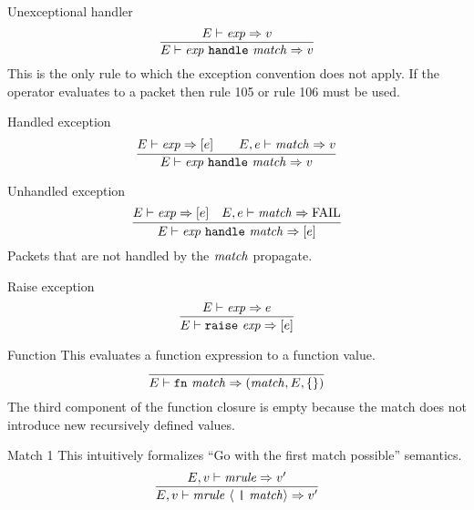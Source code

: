 \begin{inference-rule}{Unexceptional handler}
\begin{equation}\label{rule:dynamic-core:handlexp}
\vcenter{\infer{\E\ts\handlexp\ra\V}
  {\E\ts\exp\ra\V}}
\end{equation}
This is the only rule to which the exception convention does not apply.
If the operator evaluates to a packet then rule 105 or rule 106 must be
used.
\end{inference-rule}

\begin{inference-rule}{Handled exception}
\begin{equation}\label{rule:dynamic-core:handlexp2}
\vcenter{\infer{\E\ts\handlexp\ra\V}
  {\E\ts\exp\ra[\exval]\qquad\E,\exval\ts\match\ra\V}}
\end{equation}
\end{inference-rule}

\begin{inference-rule}{Unhandled exception}
\begin{equation}\label{rule:dynamic-core:handlexp3}
\vcenter{\infer{\E\ts\handlexp\ra[\exval]}
  {\E\ts\exp\ra[\exval]
    & \E,\exval\ts\match\ra\FAIL}}
\end{equation}
Packets that are not handled by the $\textit{match\/}$ propagate.
\end{inference-rule}

\begin{inference-rule}{Raise exception}
\begin{equation}\label{rule:dynamic-core:raisexp}
\vcenter{\infer{\E\ts\raisexp\ra[\exval]}
  {\E\ts\exp\ra\exval}}
\end{equation}
\end{inference-rule}

\begin{inference-rule}{Function}
This evaluates a function expression to a function value.
\begin{equation}\label{rule:dynamic-core:funexp}
\vcenter{\infer{\E\ts\fnexp\ra(\match,\E,\emptymap)}
  {}}
\end{equation}
The third component of the function closure is empty because the
match does not introduce new recursively defined values.
\end{inference-rule}


\begin{inference-rule}{Match 1}
This intuitively formalizes ``Go with the first match possible'' semantics.
\begin{equation}\label{rule:dynamic-core:match1}
\vcenter{\infer{\E,\V\ts\longmatch\ra\V'}{\E,\V\ts\mrule\ra\V'}}
\end{equation}
\end{inference-rule}

